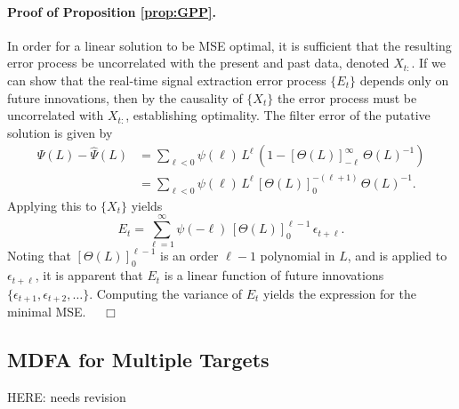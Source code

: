 \documentclass[a4paper]{book}
\begin{document}
\paragraph{Proof of Proposition \ref{prop:GPP}.}
 In order for a linear solution to be MSE optimal, it is sufficient that the
 resulting error process be uncorrelated with the present and past data, denoted $X_{t:}$.
   If we can show that the real-time signal extraction error process $\{ E_t \}$
  depends only on future innovations, then by the causality of $\{ X_t \}$ the error process 
  must be uncorrelated   with $X_{t:}$, establishing optimality.  
 The filter error of the putative solution is  
  given by
\begin{align*}
 \Psi (L) - \widehat{\Psi} (L) & = \sum_{\ell < 0 } \psi (\ell) \, L^{\ell} \,
   \left( 1 -   {[ \Theta (L) ]}_{-\ell}^{\infty} \, { \Theta (L) }^{-1} \right) \\
  & =  \sum_{\ell < 0 } \psi (\ell) \, L^{\ell} \, 
  {[ \Theta (L) ]}_{0}^{ -(\ell + 1)} \, { \Theta (L) }^{-1}.
\end{align*}
 Applying this to $\{ X_t \}$ yields
\[
  E_t = \sum_{\ell =1 }^{\infty} \psi (-\ell) \, {[ \Theta (L) ]}_0^{\ell - 1} \, 
   \epsilon_{t + \ell }.
\]
  Noting that ${[ \Theta (L) ]}_0^{\ell - 1}$ is an order $\ell-1$ polynomial in $L$,
 and is applied to $\epsilon_{t+ \ell}$, it is apparent that $E_t$ is a linear function
 of future innovations $\{ \epsilon_{t+1}, \epsilon_{t+2}, \ldots \}$.  Computing
 the variance of $E_t$ yields the expression for the minimal MSE.  $\quad \Box$

 
\subsection{MDFA for Multiple Targets}

HERE: needs revision
\end{document}
